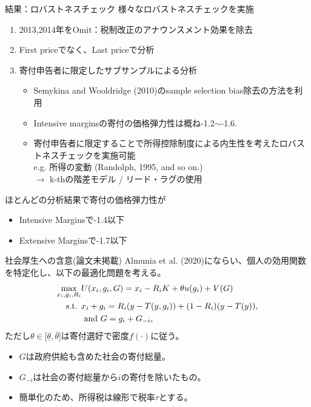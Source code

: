 \documentclass[dvipdfmx,10pt]{beamer}
\begin{document}
\begin{frame}{結果：ロバストネスチェック}
 様々なロバストネスチェックを実施
		\begin{enumerate}
			\item 2013,2014年をOmit：税制改正のアナウンスメント効果を除去
			\item First priceでなく、Last priceで分析
			\item 寄付申告者に限定したサブサンプルによる分析
			\begin{itemize}
				\item Semykina and Wooldridge (2010)のsample selection bias除去の方法を利用
				\item Intensive marginsの寄付の価格弾力性は概ね-1.2\(\sim\)-1.6.
				\item 寄付申告者に限定することで所得控除制度による内生性を考えたロバストネスチェックを実施可能\\
				e.g. 所得の変動 (Randolph, 1995, and so on.)\\
				$\to$ k-thの階差モデル / リード・ラグの使用  
			\end{itemize}
		\end{enumerate}
		ほとんどの分析結果で寄付の価格弾力性が
		\begin{itemize}
			\item Intensive Marginsで-1.4以下 
			\item Extensive Marginsで-1.7以下
		\end{itemize}
\end{frame}

\begin{frame}{社会厚生への含意(論文未掲載)}
	Almunia et al. (2020)にならい、個人の効用関数を特定化し、以下の最適化問題を考える。
	\begin{align}
		\max_{x_i,g_i,R_i}&U(x_i,g_i,G)= x_i - R_iK +\theta u(g_i) + V(G)\notag\\
		\text{s.t. }&x_i + g_i = R_i(y-T(y, g_i)) + (1-R_i)(y-T(y)),\notag\\
		&\text{ and }G=g_i+G_{-i}\notag,
	\end{align}
	ただし$\theta\in[\underline{\theta},\bar{\theta}$]は寄付選好で密度$f(\cdot)$に従う。 
	\begin{itemize}
		\item $G$は政府供給も含めた社会の寄付総量。
		\item $G_{-i}$は社会の寄付総量から$i$の寄付を除いたもの。
		\item 簡単化のため、所得税は線形で税率$\tau$とする。
	\end{itemize}
\end{frame}
\end{document}
